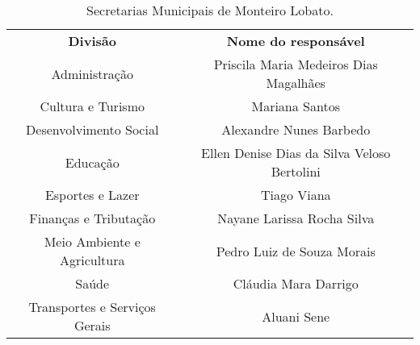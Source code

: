 \begin{table}[htbp]
	\centering
	\caption{Secretarias Municipais de Monteiro Lobato.}
	\begin{tabular}{c|c}
		\rowcolor[rgb]{ .969,  .588,  .275} \textcolor[rgb]{ 1,  1,  1}{\textbf{Divisão}} & \textcolor[rgb]{ 1,  1,  1}{\textbf{Nome do responsável}} \\
		\rowcolor[rgb]{ .992,  .914,  .851} Administração & Priscila Maria Medeiros Dias Magalhães \\
		\rowcolor[rgb]{ .984,  .831,  .706} Cultura e Turismo & Mariana Santos \\
		\rowcolor[rgb]{ .992,  .914,  .851} Desenvolvimento Social & Alexandre Nunes Barbedo \\
		\rowcolor[rgb]{ .984,  .831,  .706} Educação & Ellen Denise Dias da Silva Veloso Bertolini \\
		\rowcolor[rgb]{ .992,  .914,  .851} Esportes e Lazer & Tiago Viana \\
		\rowcolor[rgb]{ .984,  .831,  .706} Finanças e Tributação & Nayane Larissa Rocha Silva \\
		\rowcolor[rgb]{ .992,  .914,  .851} Meio Ambiente e Agricultura & Pedro Luiz de Souza Morais \\
		\rowcolor[rgb]{ .984,  .831,  .706} Saúde & Cláudia Mara Darrigo \\
		\rowcolor[rgb]{ .992,  .914,  .851} Transportes e Serviços Gerais & Aluani Sene \\
	\end{tabular}%
	\label{tab:secretarias}%
\end{table}%
